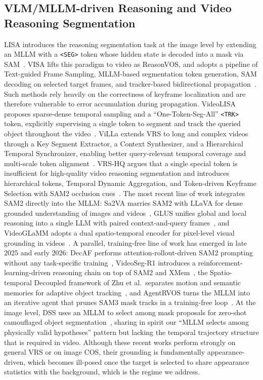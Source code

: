 \documentclass[11pt]{article}
\begin{document}
\subsection{VLM/MLLM-driven Reasoning and Video Reasoning Segmentation}
LISA introduces the reasoning segmentation task at the image level by extending an MLLM with a \texttt{<SEG>} token whose hidden state is decoded into a mask via SAM~\cite{lisa}.
VISA lifts this paradigm to video as ReasonVOS, and adopts a pipeline of Text-guided Frame Sampling, MLLM-based segmentation token generation, SAM decoding on selected target frames, and tracker-based bidirectional propagation~\cite{visa}.
Such methods rely heavily on the correctness of keyframe localization and are therefore vulnerable to error accumulation during propagation.
VideoLISA proposes sparse-dense temporal sampling and a ``One-Token-Seg-All'' \texttt{<TRK>} token, explicitly supervising a single token to segment and track the queried object throughout the video~\cite{videolisa}.
ViLLa extends VRS to long and complex videos through a Key Segment Extractor, a Context Synthesizer, and a Hierarchical Temporal Synchronizer, enabling better query-relevant temporal coverage and multi-scale token alignment~\cite{villa}.
VRS-HQ argues that a single special token is insufficient for high-quality video reasoning segmentation and introduces hierarchical tokens, Temporal Dynamic Aggregation, and Token-driven Keyframe Selection with SAM2 occlusion cues~\cite{vrshq}.
The most recent line of work integrates SAM2 directly into the MLLM: Sa2VA marries SAM2 with LLaVA for dense grounded understanding of images and videos~\cite{sa2va}, GLUS unifies global and local reasoning into a single LLM with paired context-and-query frames~\cite{glus}, and VideoGLaMM adopts a dual spatio-temporal encoder for pixel-level visual grounding in videos~\cite{videoglamm}.
A parallel, training-free line of work has emerged in late 2025 and early 2026: DecAF performs attention-rollout-driven SAM2 prompting without any task-specific training~\cite{decaf}, VideoSeg-R1 introduces a reinforcement-learning-driven reasoning chain on top of SAM2 and XMem~\cite{videosegr1}, the Spatio-temporal Decoupled framework of Zhu et al.\ separates motion and semantic memories for adaptive object tracking~\cite{stdec}, and AgentRVOS turns the MLLM into an iterative agent that prunes SAM3 mask tracks in a training-free loop~\cite{agentrvos}.
At the image level, DSS uses an MLLM to select among mask proposals for zero-shot camouflaged object segmentation~\cite{dss}, sharing in spirit our ``MLLM selects among physically valid hypotheses'' pattern but lacking the temporal trajectory structure that is required in video.
Although these recent works perform strongly on general VRS or on image COS, their grounding is fundamentally appearance-driven, which becomes ill-posed once the target is selected to share appearance statistics with the background, which is the regime we address.
\end{document}
